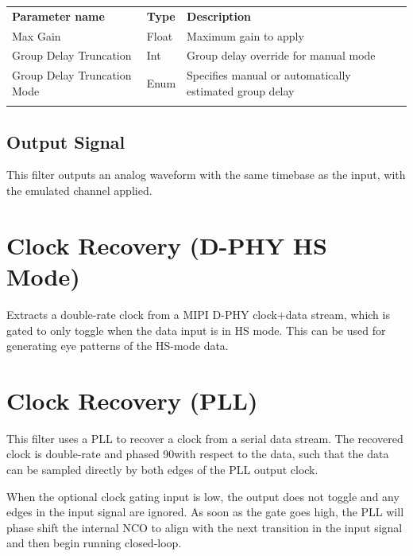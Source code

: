 \begin{tabularx}{16cm}{llX}
\thickhline
\textbf{Parameter name} & \textbf{Type} & \textbf{Description} \\
\thickhline
Max Gain & Float & Maximum gain to apply\\
\thinhline
Group Delay Truncation & Int & Group delay override for manual mode\\
\thinhline
Group Delay Truncation Mode & Enum & Specifies manual or automatically estimated group delay\\
\thickhline
\end{tabularx}

\subsection{Output Signal}

This filter outputs an analog waveform with the same timebase as the input, with the emulated channel applied.

\pagebreak
\section{Clock Recovery (D-PHY HS Mode)}

Extracts a double-rate clock from a MIPI D-PHY clock+data stream, which is gated to only toggle when the data input
is in HS mode. This can be used for generating eye patterns of the HS-mode data.

\pagebreak
\section{Clock Recovery (PLL)}
\label{filter:cdrpll}

This filter uses a PLL to recover a clock from a serial data stream. The recovered clock is double-rate and
phased 90\textdegree with respect to the data, such that the data can be sampled directly by both edges of the PLL
output clock.

When the optional clock gating input is low, the output does not toggle and any edges in the input signal are ignored.
As soon as the gate goes high, the PLL will phase shift the internal NCO to align with the next transition in the input
signal and then begin running closed-loop.

